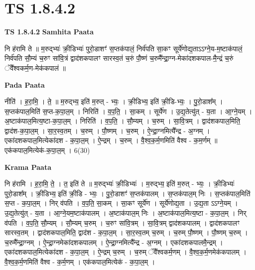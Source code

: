 \documentclass[17pt]{extarticle}
\begin{document}
\section{ TS 1.8.4.2 }

\textbf{TS 1.8.4.2 } \newline
\textbf{Samhita Paata} \newline

नि ह॑रामि ते ॥ म॒रुद्भ्यः॑ क्री॒डिभ्यः॑ पुरो॒डाशꣳ॑ स॒प्तक॑पालं॒ निर्व॑पति सा॒कꣳ सूर्ये॑णोद्य॒ताऽऽग्ने॒य-म॒ष्टाक॑पालं॒ निर्व॑पति सौ॒म्यं च॒रुꣳ सा॑वि॒त्रं द्वाद॑शकपालꣳ सारस्व॒तं च॒रुं पौ॒ष्णं च॒रुमै᳚न्द्रा॒ग्न-मेका॑दशकपाल-मै॒न्द्रं च॒रुं ॅवै᳚श्वकर्म॒ण-मेक॑कपालं ॥ \newline

\textbf{Pada Paata} \newline

नीति॑ । ह॒रा॒मि॒ । ते॒ ॥ म॒रुद्भ्य॒ इति॑ म॒रुत् - भ्यः॒ । क्री॒डिभ्य॒ इति॑ क्री॒डि-भ्यः॒ । पु॒रो॒डाश᳚म् । स॒प्तक॑पाल॒मिति॑ स॒प्त-क॒पा॒ल॒म् । निरिति॑ । व॒प॒ति॒ । सा॒कम् । सूर्ये॑ण । उ॒द्य॒तेत्यु॑त् - य॒ता । आ॒ग्ने॒यम् । अ॒ष्टाक॑पाल॒मित्य॒ष्टा-क॒पा॒ल॒म् । निरिति॑ । व॒प॒ति॒ । सौ॒म्यम् । च॒रुम् । सा॒वि॒त्रम् । द्वाद॑शकपाल॒मिति॒ द्वाद॑श-क॒पा॒ल॒म् । सा॒र॒स्व॒तम् । च॒रुम् । पौ॒ष्णम् । च॒रुम् । ऐ॒न्द्रा॒ग्नमित्यै᳚न्द्र - अ॒ग्नम् । एका॑दशकपाल॒मित्येका॑दश - क॒पा॒ल॒म् । ऐ॒न्द्रम् । च॒रुम् । वै॒श्व॒क॒र्म॒णमिति॑ वैश्व - क॒म॒र्णम् ॥ एक॑कपाल॒मित्येक॑-क॒पा॒ल॒म् । 6(30)  \newline


\textbf{Krama Paata} \newline

नि ह॑रामि । ह॒रा॒मि॒ ते॒ । त॒ इति॑ ते ॥ म॒रुद्भ्यः॑ क्री॒डिभ्यः॑ । म॒रुद्भ्य॒ इति॑ म॒रुत् - भ्यः॒ । क्री॒डिभ्यः॑ पुरो॒डाश᳚म् । क्री॒डिभ्य॒ इति॑ क्री॒डि - भ्यः॒ । पु॒रो॒डाशꣳ॑ स॒प्तक॑पालम् । स॒प्तक॑पाल॒म् निः । स॒प्तक॑पाल॒मिति॑ स॒प्त - क॒पा॒ल॒म् । निर् व॑पति । व॒प॒ति॒ सा॒कम् । सा॒कꣳ सूर्ये॑ण । सूर्ये॑णोद्य॒ता । उ॒द्य॒ता ऽऽग्ने॒यम् । उ॒द्य॒तेत्यु॑त् - य॒ता । आ॒ग्ने॒यम॒ष्टाक॑पालम् । अ॒ष्टाक॑पाल॒म् निः । अ॒ष्टाक॑पाल॒मित्य॒ष्टा - क॒पा॒ल॒म् । निर् व॑पति । व॒प॒ति॒ सौ॒म्यम् । सौ॒म्यम् च॒रुम् । च॒रुꣳ सा॑वि॒त्रम् । सा॒वि॒त्रम् द्वाद॑शकपालम् । द्वाद॑शकपालꣳ सारस्व॒तम् । द्वाद॑शकपाल॒मिति॒ द्वाद॑श - क॒पा॒ल॒म् । सा॒र॒स्व॒तम् च॒रुम् । च॒रुम् पौ॒ष्णम् । पौ॒ष्णम् च॒रुम् । च॒रुमै᳚न्द्रा॒ग्नम् । ऐ॒न्द्रा॒ग्नमेका॑दशकपालम् । ऐ॒न्द्रा॒ग्नमित्यै᳚न्द्र - अ॒ग्नम् । एका॑दशकपालमै॒न्द्रम् । एका॑दशकपाल॒मित्येका॑दश - क॒पा॒ल॒म् । ऐ॒न्द्रम् च॒रुम् । च॒रुम् ॅवै᳚श्वकर्म॒णम् । वै॒श्व॒क॒र्म॒णमेक॑कपालम् । वै॒श्व॒क॒र्म॒णमिति॑ वैश्व - क॒र्म॒णम् । एक॑कपाल॒मित्येक॑ - क॒पा॒ल॒म् । \newline
\end{document}
